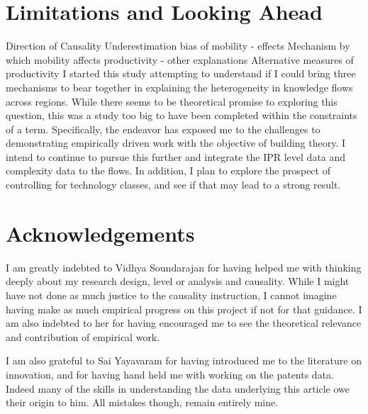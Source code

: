 \documentclass[12pt]{article}
\begin{document}
\section{Limitations and Looking Ahead}
Direction of Causality
Underestimation bias of mobility - effects
Mechanism by which mobility affects productivity - other explanations
Alternative measures of productivity
I started this study attempting to understand if I could bring three mechanisms to bear together in explaining the heterogeneity in knowledge flows across regions. While there seems to be theoretical promise to exploring this question, this was a study too big to have been completed within the constraints of a term. Specifically, the endeavor has exposed me to the challenges to demonstrating empirically driven work with the objective of building theory. I intend to continue to pursue this further and integrate the IPR level data and complexity data to the flows. In addition, I plan to explore the prospect of controlling for technology classes, and see if that may lead to a strong result.  

\section{Acknowledgements}
I am greatly indebted to Vidhya Soundarajan for having helped me with thinking deeply about my research design, level or analysis and causality. While I might have not done as much justice to the causality instruction, I cannot imagine having make as much empirical progress on this project if not for that guidance. I am also indebted to her for having encouraged me to see the theoretical relevance and contribution of empirical work.

I am also grateful to Sai Yayavaram for having introduced me to the literature on innovation, and for having hand held me with working on the patents data. Indeed many of the skills in understanding the data underlying this article owe their origin to him. All mistakes though, remain entirely mine.

\singlespacing
 

\end{document}

